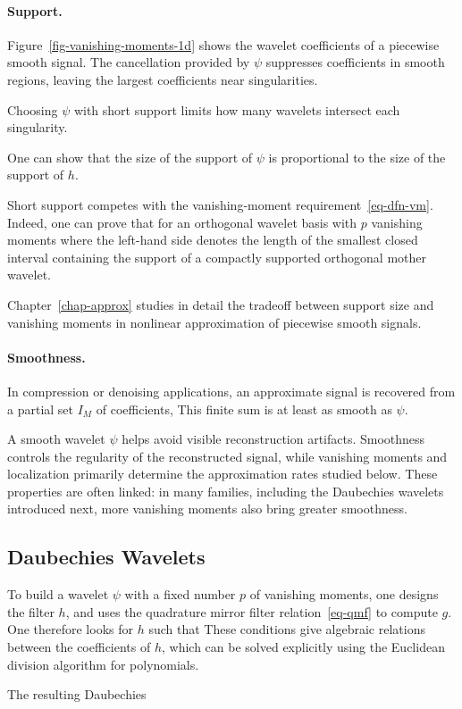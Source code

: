   
\paragraph{Support.}

Figure~\ref{fig-vanishing-moments-1d} shows the wavelet coefficients of a piecewise smooth signal. The cancellation provided by $\psi$ suppresses coefficients in smooth regions, leaving the largest coefficients near singularities.


Choosing $\psi$ with short support limits how many wavelets intersect each singularity.
 
One can show that the size of the support of $\psi$ is proportional to the size of the support of $h$.
 
Short support competes with the vanishing-moment requirement~\eqref{eq-dfn-vm}. Indeed, one can prove that
for an orthogonal wavelet basis with $p$ vanishing moments
where the left-hand side denotes the length of the smallest closed interval containing the support of a compactly supported orthogonal mother wavelet.


Chapter~\ref{chap-approx} studies in detail the tradeoff between support size and vanishing moments in nonlinear approximation of piecewise smooth signals.

  
\paragraph{Smoothness.}

In compression or denoising applications, an approximate signal is recovered from a partial set $I_M$ of coefficients,
This finite sum is at least as smooth as $\psi$.

A smooth wavelet $\psi$ helps avoid visible reconstruction artifacts. Smoothness controls the regularity of the reconstructed signal, while vanishing moments and localization primarily determine the approximation rates studied below. These properties are often linked: in many families, including the Daubechies wavelets introduced next, more vanishing moments also bring greater smoothness.


                                   
\subsection{Daubechies Wavelets}

To build a wavelet $\psi$ with a fixed number $p$ of vanishing moments, one designs the filter $h$, and uses the quadrature mirror filter relation~\eqref{eq-qmf} to compute $g$. One therefore looks for $h$ such that
These conditions give algebraic relations between the coefficients of $h$, which can be solved explicitly using the Euclidean division algorithm for polynomials.

The resulting Daubechies